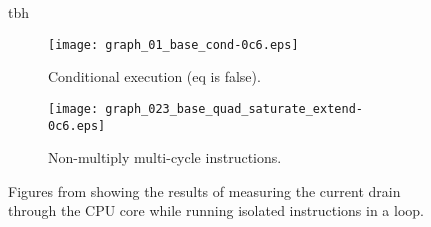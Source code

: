 \begin{figure}{tbh}
\begin{subfigure}[b]{0.48\textwidth}
\texttt{[image: graph\_01\_base\_cond-0c6.eps]}
\caption{Conditional execution (eq is false).}
\label{fig:consumptioncond}
\end{subfigure}
\begin{subfigure}[b]{0.52\textwidth}
\texttt{[image: graph\_023\_base\_quad\_saturate\_extend-0c6.eps]}
\caption{Non-multiply multi-cycle instructions.}
\label{fig:consumptionmulti}
\end{subfigure}
\caption{Figures from \cite{rundehvatum2013exploring} showing the results of measuring the
current drain through the CPU core while running isolated instructions in a loop.}
\label{fig:consumption}
\end{figure}

